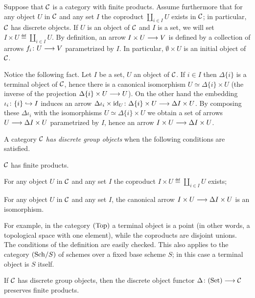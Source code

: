 \begin{2   CONTRAVARIANT FUNCTORS}
\begin{2.2 Group objects}
Suppose that $\mathcal{C}$ is a category with finite products. Assume furthermore that for any object $U$ in $\mathcal{C}$ and any set $I$ the coproduct $\coprod_{i \in I} U$ exists in $\mathcal{C}$; in particular, $\mathcal{C}$ has discrete objects.  If $U$ is an object of $\mathcal{C}$ and $I$ is a set, we will set $I \times U \eqdef \coprod_{i \in I}U$. By definition, an arrow $I \times U \arr V$ is defined by a collection of arrows $f_i \colon U \arr V$ parametrized by $I$. In particular, $\emptyset \times U$ is an initial object of $\mathcal{C}$.

Notice the following fact. Let $I$ be a set, $U$ an object of 
$\mathcal{C}$. If $i \in I$ then $\Delta\{i\}$ is a terminal object of $\mathcal{C}$, hence there is a canonical isomorphism $U \simeq \Delta\{i\} \times U$ (the inverse of the projection $\Delta \{i\} \times U \arr U$). On the other hand the embedding $\iota_i \colon \{i\} \hookrightarrow I$ induces an arrow $\Delta\iota_i \times \id_U \colon \Delta\{i\} \times U \arr \Delta I \times U$. By composing these $\Delta\iota_i$ with the isomorphisms $U \simeq \Delta\{i\} \times U$ we obtain a set of arrows $U \arr \Delta I \times U$ parametrized by $I$, hence an arrow $I \times U \arr \Delta I \times U$.

\begin{definition}
A category $\mathcal{C}$ \emph{has discrete group objects}%
 when the following conditions are satisfied.

\begin{enumeratei}

 $\mathcal{C}$ has finite products.

  For any object $U$ in $\mathcal{C}$ and any set $I$ the coproduct $I \times U \eqdef \coprod_{i \in I} U$ exists;

 For any object $U$ in $\mathcal{C}$ and any set $I$, the canonical arrow $I \times U \arr \Delta I \times U$ is an isomorphism.
\end{enumeratei}

\end{definition}

For example, in the category $(\mathrm{Top})$ a terminal object is a point (in other words, a topological space with one element), while the coproducts are disjoint unions. The conditions of the definition are easily checked. This also applies to the category $({\mathrm{Sch}/S})$ of schemes over a fixed base scheme $S$; in this case a terminal object is $S$ itself.


\begin{proposition}\label{prop:has-discrete-groups}
If $\mathcal{C}$ has discrete group objects, then the discrete object functor $\Delta \colon \catset \arr \cC$ preserves finite products.%
%
\end{proposition}



\end{2.2 Group objects}
\end{2   CONTRAVARIANT FUNCTORS}
